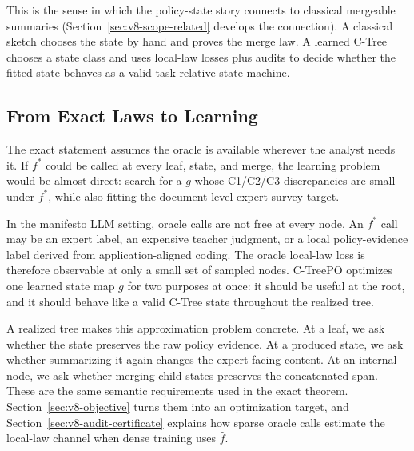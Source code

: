 This is the sense in which the policy-state story connects to
classical mergeable summaries (Section~\ref{sec:v8-scope-related}
develops the connection). A classical sketch chooses the state by
hand and proves the merge law. A learned C-Tree chooses a state class
and uses local-law losses plus audits to decide whether the fitted
state behaves as a valid task-relative state machine.

\subsection{From Exact Laws to Learning}

The exact statement assumes the oracle is available wherever the
analyst needs it. If \(f^\ast\) could be called at every leaf, state,
and merge, the learning problem would be almost direct: search for a
\(g\) whose C1/C2/C3 discrepancies are small under \(f^\ast\), while
also fitting the document-level expert-survey target.

In the manifesto LLM setting, oracle calls are not free at every node.
An \(f^\ast\) call may be an expert label, an expensive teacher
judgment, or a local policy-evidence label derived from
application-aligned coding. The oracle local-law loss is therefore
observable at only a small set of sampled nodes. C-TreePO optimizes
one learned state map \(g\) for two purposes at once: it should be
useful at the root, and it should behave like a valid C-Tree state
throughout the realized tree.

A realized tree makes this approximation problem concrete. At a leaf,
we ask whether the state preserves the raw policy evidence. At a
produced state, we ask whether summarizing it again changes the
expert-facing content. At an internal node, we ask whether merging
child states preserves the concatenated span. These are the same
semantic requirements used in the exact theorem.
Section~\ref{sec:v8-objective} turns them into an optimization target,
and Section~\ref{sec:v8-audit-certificate} explains how sparse oracle
calls estimate the local-law channel when dense training uses
\(\widehat f\).
